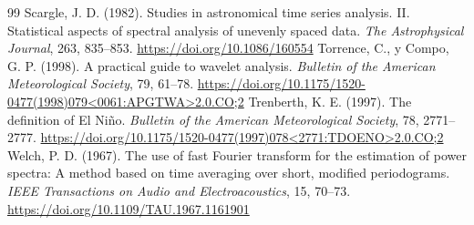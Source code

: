 \documentclass[11pt,letterpaper]{article}
\begin{document}
\begin{thebibliography}{99}
 Scargle, J. D. (1982). Studies in astronomical time series analysis. II. Statistical aspects of spectral analysis of unevenly spaced data. \emph{The Astrophysical Journal}, 263, 835--853. \url{https://doi.org/10.1086/160554}
 Torrence, C., y Compo, G. P. (1998). A practical guide to wavelet analysis. \emph{Bulletin of the American Meteorological Society}, 79, 61--78. \url{https://doi.org/10.1175/1520-0477(1998)079<0061:APGTWA>2.0.CO;2}
 Trenberth, K. E. (1997). The definition of El Niño. \emph{Bulletin of the American Meteorological Society}, 78, 2771--2777. \url{https://doi.org/10.1175/1520-0477(1997)078<2771:TDOENO>2.0.CO;2}
 Welch, P. D. (1967). The use of fast Fourier transform for the estimation of power spectra: A method based on time averaging over short, modified periodograms. \emph{IEEE Transactions on Audio and Electroacoustics}, 15, 70--73. \url{https://doi.org/10.1109/TAU.1967.1161901}
\end{thebibliography}
\end{document}

